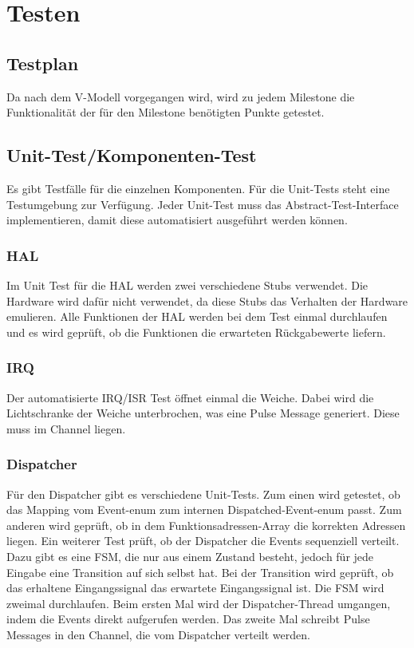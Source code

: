 \documentclass[oneside,a4paper,titlepage]{scrartcl}              %
\begin{document}
\section{Testen}

\subsection{Testplan}
Da nach dem V-Modell vorgegangen wird, wird zu jedem Milestone die Funktionalität der für den Milestone benötigten Punkte getestet.

\subsection{Unit-Test/Komponenten-Test}
Es gibt Testfälle für die einzelnen Komponenten. Für die Unit-Tests steht eine Testumgebung zur Verfügung.
Jeder Unit-Test muss das Abstract-Test-Interface implementieren, damit diese automatisiert ausgeführt werden
können.

\subsubsection{HAL}
Im Unit Test für die HAL werden zwei verschiedene Stubs verwendet. Die Hardware wird dafür nicht verwendet,
da diese Stubs das Verhalten der Hardware emulieren. Alle Funktionen der HAL werden bei dem Test einmal durchlaufen
und es wird geprüft, ob die Funktionen die erwarteten Rückgabewerte liefern.

\subsubsection{IRQ}
Der automatisierte IRQ/ISR Test öffnet einmal die Weiche. Dabei wird die Lichtschranke der Weiche unterbrochen,
was eine Pulse Message generiert. Diese muss im Channel liegen.

\subsubsection{Dispatcher}
Für den Dispatcher gibt es verschiedene Unit-Tests. Zum einen wird getestet,
ob das Mapping vom Event-enum zum internen Dispatched-Event-enum passt.
Zum anderen wird geprüft, ob in dem Funktionsadressen-Array die korrekten Adressen liegen.\newline
Ein weiterer Test prüft, ob der Dispatcher die Events sequenziell verteilt. Dazu gibt es eine
FSM, die nur aus einem Zustand besteht, jedoch für jede Eingabe eine Transition auf sich selbst hat.\newline
Bei der Transition wird geprüft, ob das erhaltene Eingangssignal das erwartete Eingangssignal ist.
Die FSM wird zweimal durchlaufen. Beim ersten Mal wird der Dispatcher-Thread umgangen, indem die Events
direkt aufgerufen werden. Das zweite Mal schreibt Pulse Messages in den Channel, die vom Dispatcher
verteilt werden.
\end{document}
